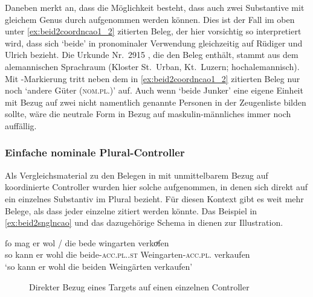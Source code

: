 \label{phsec:jungherren}
Daneben merkt \textcite[384]{paul2007} an, dass die Möglichkeit besteht, dass
auch zwei Substantive mit gleichem Genus durch
 aufgenommen werden können. Dies ist der Fall im oben unter
\cref{ex:beid2coordncao1_2} zitierten Beleg, der hier vorsichtig so
interpretiert wird, dass sich  `beide' in pronominaler Verwendung
gleichzeitig auf Rüdiger und Ulrich bezieht. Die Urkunde Nr.~2915
\autocite[213,14--42]{cao4}, die den Beleg enthält, stammt aus dem alemannischen
Sprachraum (Kloster St.~Urban, Kt.~Luzern; hochalemannisch). Mit
-Markierung tritt neben dem in \cref{ex:beid2coordncao1_2} zitierten
Beleg nur noch  `andere Güter (\textsc{nom.pl.\NeutI})'
\autocites(Nr.~2915)[213.27]{cao4} auf. Auch wenn  `beide
Junker' eine eigene Einheit mit Bezug auf zwei nicht namentlich genannte
Personen in der Zeugenliste bilden sollte, wäre die neutrale Form
 in Bezug auf maskulin-männliches  immer noch
auffällig.

\subsubsection{Einfache nominale Plural-Controller}
\label{subsubsec:persplnp}

Als Vergleichsmaterial zu den Belegen in  mit
unmittelbarem Bezug auf koordinierte Controller wurden hier solche aufgenommen,
in denen sich  direkt auf ein einzelnes Substantiv im Plural
bezieht. Für diesen Kontext gibt es weit mehr Belege, als dass jeder einzelne
zitiert werden könnte. Das Beispiel in \cref{ex:beid2snglncao} und das
dazugehörige Schema in  dienen zur Illustration.

\begin{exe}
\ex \label{ex:beid2snglncao}
	\gll ſo mag er wol / die bede wingarten \textelp{}
			verkoͮfen \\
		so kann er wohl {} die beide-\textsc{acc.pl.\MascI.st}
			Weingarten-\textsc{acc.pl.\MascI} {} verkaufen \\
	\trans `so kann er wohl die beiden Weingärten \textelp{} verkaufen'
		\parencites(Nr.~1221, Zürich, 1290)[484,9]{cao2}
\end{exe}

\begin{figure}
\caption{Direkter Bezug eines Targets auf einen einzelnen Controller}
\label{fig:beid2snglncao}
\end{figure}

